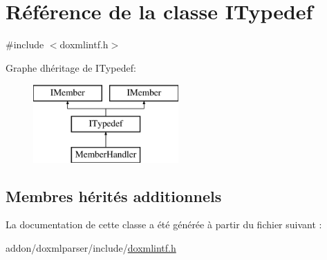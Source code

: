 \hypertarget{class_i_typedef}{}\section{Référence de la classe I\+Typedef}
\label{class_i_typedef}


{\ttfamily \#include $<$doxmlintf.\+h$>$}

Graphe d\textquotesingle{}héritage de I\+Typedef\+:\begin{figure}[H]
\begin{center}
\leavevmode
\includegraphics[height=3.000000cm]{class_i_typedef}
\end{center}
\end{figure}
\subsection*{Membres hérités additionnels}


La documentation de cette classe a été générée à partir du fichier suivant \+:\begin{DoxyCompactItemize}
\item 
addon/doxmlparser/include/\hyperlink{include_2doxmlintf_8h}{doxmlintf.\+h}\end{DoxyCompactItemize}
